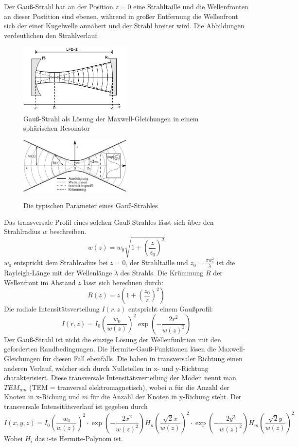\documentclass[bigchapter,colorback,accentcolor=tud4b,linedtoc,11pt]{tudreport}
\numberwithin{equation}{subsection}
\begin{document}
Der Gauß-Strahl hat an der Position \(z=0\) eine Strahltaille und die Wellenfronten an dieser Postition sind ebenen, während in großer Entfernung die Wellenfront sich der einer Kugelwelle annähert und der Strahl breiter wird. Die Abbildungen
\cite{Resonatortheorie}\cite{GSParamater} verdeutlichen den Strahlverlauf.

\begin{figure}[h]
	\centering
		\includegraphics[width=0.5\textwidth]{img/gauss_res.png}
	\caption{Gauß-Strahl als Lösung der Maxwell-Gleichungen in einem sphärischen Resonator}
\end{figure}
\begin{figure}[h]
	\centering
		\includegraphics[width=0.5\textwidth]{img/gauss_param.png}
	\caption{Die typischen Parameter eines Gauß-Strahles}
\cite{GSParamater}
\end{figure}
\FloatBarrier

Das transversale Profil eines solchen Gauß-Strahles lässt sich über den Strahlradius $w$ beschreiben.
$$w(z) = w_0 \sqrt{1+\left(\frac{z}{z_0}\right)^2}$$
$w_0$ entspricht dem Strahlradius bei $z=0$, der Strahltaille und $z_0 = \frac{\pi w_0^2}{\lambda}$ ist die Rayleigh-Länge mit der Wellenlänge $\lambda$ des Strahls.
Die Krümmung $R$ der Wellenfront im Abstand $z$ lässt sich berechnen durch:
$$R(z) = z \left(1+\left(\frac{z_0}{z}\right)^2\right)$$
Die radiale Intensitätsverteilung $I(r,z)$ entspricht einem Gaußprofil:
$$ I(r,z) = I_0 \left(\frac{w_0}{w(z)}\right)^2 \exp\left(-\frac{2r^2}{w(z)^2}\right)  $$
Der Gauß-Strahl ist nicht die einzige Lösung der Wellenfunktion mit den geforderten Randbedingungen. Die Hermite-Gauß-Funktionen lösen die Maxwell-Gleichungen für diesen Fall ebenfalls. Die haben in transversaler Richtung einen anderen Verlauf, welcher sich durch Nullstellen in x- und y-Richtung charakterisiert. Diese transversale Intensitätsverteilung der Moden nennt man $TEM_{nm}$ (TEM = tranversal elektromagnetisch), wobei $n$ für die Anzahl der Knoten in x-Richung und $m$ für die Anzahl der Knoten in y-Richung steht.
Der transversale Intensitätsverlauf ist gegeben durch
$$I(x,y, z) = I_0 \left(\frac{w_0}{w(z)}\right)^2 \cdot \exp\left(-\frac{2 x^2}{w(z)^2}\right) H_n\left(\frac{\sqrt{2}x}{w(z)}\right)^2 \cdot \exp\left(-\frac{2 y^2}{w(z)^2}\right) H_m\left(\frac{\sqrt{2}y}{w(z)}\right)^2$$
Wobei $H_i$ das i-te Hermite-Polynom ist.
\end{document}
